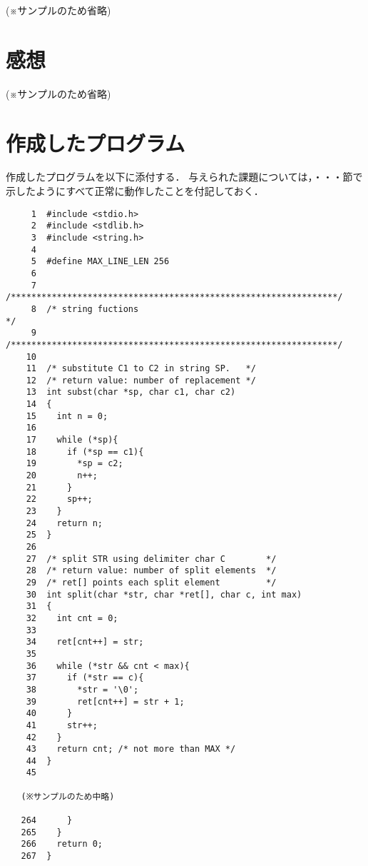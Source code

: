 \documentclass[a4j,11pt]{jarticle}
\begin{document}
(※サンプルのため省略)

\section{感想}

(※サンプルのため省略)

\section{作成したプログラム}\label{sec:program}

作成したプログラムを以下に添付する．
与えられた課題については，・・・節で示したようにすべて正常に動作したことを付記しておく．

%
%
{\fontsize{10pt}{11pt} \selectfont
\begin{verbatim}
     1  #include <stdio.h>
     2  #include <stdlib.h>
     3  #include <string.h>
     4
     5  #define MAX_LINE_LEN 256
     6
     7  /****************************************************************/
     8  /* string fuctions                                              */
     9  /****************************************************************/
    10
    11  /* substitute C1 to C2 in string SP.   */
    12  /* return value: number of replacement */
    13  int subst(char *sp, char c1, char c2)
    14  {
    15    int n = 0;
    16
    17    while (*sp){
    18      if (*sp == c1){
    19        *sp = c2;
    20        n++;
    21      }
    22      sp++;
    23    }
    24    return n;
    25  }
    26
    27  /* split STR using delimiter char C        */
    28  /* return value: number of split elements  */
    29  /* ret[] points each split element         */
    30  int split(char *str, char *ret[], char c, int max)
    31  {
    32    int cnt = 0;
    33
    34    ret[cnt++] = str;
    35
    36    while (*str && cnt < max){
    37      if (*str == c){
    38        *str = '\0';
    39        ret[cnt++] = str + 1;
    40      }
    41      str++;
    42    }
    43    return cnt; /* not more than MAX */
    44  }
    45

   (※サンプルのため中略)

   264      }
   265    }
   266    return 0;
   267  }
\end{verbatim}
}

\end{document}
